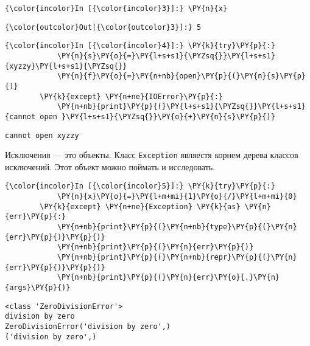     \begin{Verbatim}[commandchars=\\\{\}]
{\color{incolor}In [{\color{incolor}3}]:} \PY{n}{x}
\end{Verbatim}

            \begin{Verbatim}[commandchars=\\\{\}]
{\color{outcolor}Out[{\color{outcolor}3}]:} 5
\end{Verbatim}
        
    \begin{Verbatim}[commandchars=\\\{\}]
{\color{incolor}In [{\color{incolor}4}]:} \PY{k}{try}\PY{p}{:}
            \PY{n}{s}\PY{o}{=}\PY{l+s+s1}{\PYZsq{}}\PY{l+s+s1}{xyzzy}\PY{l+s+s1}{\PYZsq{}}
            \PY{n}{f}\PY{o}{=}\PY{n+nb}{open}\PY{p}{(}\PY{n}{s}\PY{p}{)}
        \PY{k}{except} \PY{n+ne}{IOError}\PY{p}{:}
            \PY{n+nb}{print}\PY{p}{(}\PY{l+s+s1}{\PYZsq{}}\PY{l+s+s1}{cannot open }\PY{l+s+s1}{\PYZsq{}}\PY{o}{+}\PY{n}{s}\PY{p}{)}
\end{Verbatim}

    \begin{Verbatim}[commandchars=\\\{\}]
cannot open xyzzy

    \end{Verbatim}

    Исключения --- это объекты. Класс \texttt{Exception} являестя корнем
дерева классов исключений. Этот объект можно поймать и исследовать.

    \begin{Verbatim}[commandchars=\\\{\}]
{\color{incolor}In [{\color{incolor}5}]:} \PY{k}{try}\PY{p}{:}
            \PY{n}{x}\PY{o}{=}\PY{l+m+mi}{1}\PY{o}{/}\PY{l+m+mi}{0}
        \PY{k}{except} \PY{n+ne}{Exception} \PY{k}{as} \PY{n}{err}\PY{p}{:}
            \PY{n+nb}{print}\PY{p}{(}\PY{n+nb}{type}\PY{p}{(}\PY{n}{err}\PY{p}{)}\PY{p}{)}
            \PY{n+nb}{print}\PY{p}{(}\PY{n}{err}\PY{p}{)}
            \PY{n+nb}{print}\PY{p}{(}\PY{n+nb}{repr}\PY{p}{(}\PY{n}{err}\PY{p}{)}\PY{p}{)}
            \PY{n+nb}{print}\PY{p}{(}\PY{n}{err}\PY{o}{.}\PY{n}{args}\PY{p}{)}
\end{Verbatim}

    \begin{Verbatim}[commandchars=\\\{\}]
<class 'ZeroDivisionError'>
division by zero
ZeroDivisionError('division by zero',)
('division by zero',)

    \end{Verbatim}

